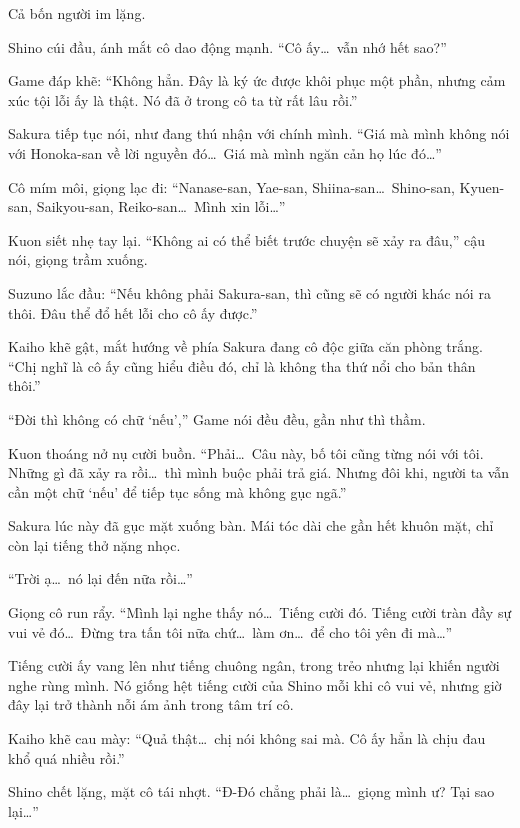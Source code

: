 \documentclass[../main.tex]{subfiles}
\begin{document}
Cả bốn người im lặng.

Shino cúi đầu, ánh mắt cô dao động mạnh. ``Cô ấy\dots\ vẫn nhớ hết sao?''

Game đáp khẽ: ``Không hẳn. Đây là ký ức được khôi phục một phần, nhưng cảm xúc tội lỗi ấy là thật. Nó đã ở trong cô ta từ rất lâu rồi.''

Sakura tiếp tục nói, như đang thú nhận với chính mình. ``Giá mà mình không nói với Honoka-san về lời nguyền đó\dots\ Giá mà mình ngăn cản họ lúc đó\dots''

Cô mím môi, giọng lạc đi: ``Nanase-san, Yae-san, Shiina-san\dots\ Shino-san, Kyuen-san, Saikyou-san, Reiko-san\dots\ Mình xin lỗi\dots''

Kuon siết nhẹ tay lại. ``Không ai có thể biết trước chuyện sẽ xảy ra đâu,'' cậu nói, giọng trầm xuống.

Suzuno lắc đầu: ``Nếu không phải Sakura-san, thì cũng sẽ có người khác nói ra thôi. Đâu thể đổ hết lỗi cho cô ấy được.''

Kaiho khẽ gật, mắt hướng về phía Sakura đang cô độc giữa căn phòng trắng. ``Chị nghĩ là cô ấy cũng hiểu điều đó, chỉ là không tha thứ nổi cho bản thân thôi.''

``Đời thì không có chữ `nếu','' Game nói đều đều, gần như thì thầm.

Kuon thoáng nở nụ cười buồn. ``Phải\dots\ Câu này, bố tôi cũng từng nói với tôi. Những gì đã xảy ra rồi\dots\ thì mình buộc phải trả giá. Nhưng đôi khi, người ta vẫn cần một chữ `nếu' để tiếp tục sống mà không gục ngã.''

Sakura lúc này đã gục mặt xuống bàn. Mái tóc dài che gần hết khuôn mặt, chỉ còn lại tiếng thở nặng nhọc.

``Trời ạ\dots\ nó lại đến nữa rồi\dots''


Giọng cô run rẩy. ``Mình lại nghe thấy nó\dots\ Tiếng cười đó. Tiếng cười tràn đầy sự vui vẻ đó\dots\ Đừng tra tấn tôi nữa chứ\dots\ làm ơn\dots\ để cho tôi yên đi mà\dots''

Tiếng cười ấy vang lên như tiếng chuông ngân, trong trẻo nhưng lại khiến người nghe rùng mình. Nó giống hệt tiếng cười của Shino mỗi khi cô vui vẻ, nhưng giờ đây lại trở thành nỗi ám ảnh trong tâm trí cô.

Kaiho khẽ cau mày: ``Quả thật\dots\ chị nói không sai mà. Cô ấy hẳn là chịu đau khổ quá nhiều rồi.''

Shino chết lặng, mặt cô tái nhợt. ``Đ-Đó chẳng phải là\dots\ giọng mình ư? Tại sao lại\dots''
\end{document}

